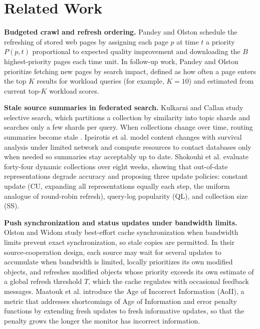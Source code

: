 \section{Related Work}
\label{sec:related}

\textbf{Budgeted crawl and refresh ordering.} Pandey and Olston \cite{pandey2005usercentric} schedule the refreshing of stored web pages by assigning each page $p$ at time $t$ a priority $P(p, t)$ proportional to expected quality improvement and downloading the $B$ highest-priority pages each time unit. In follow-up work, Pandey and Olston \cite{pandey2008crawlorder} prioritize fetching new pages by search impact, defined as how often a page enters the top $K$ results for workload queries (for example, $K = 10$) and estimated from current top-$K$ workload scores.

\textbf{Stale source summaries in federated search.} Kulkarni and Callan \cite{kulkarni2015selective} study selective search, which partitions a collection by similarity into topic shards and searches only a few shards per query. When collections change over time, routing summaries become stale \cite{ipeirotis2005changes,shokouhi2007updating}. Ipeirotis et al. \cite{ipeirotis2005changes} model content changes with survival analysis under limited network and compute resources to contact databases only when needed so summaries stay acceptably up to date. Shokouhi et al. \cite{shokouhi2007updating} evaluate forty-four dynamic collections over eight weeks, showing that out-of-date representations degrade accuracy and proposing three update policies: constant update (CU, expanding all representations equally each step, the uniform analogue of round-robin refresh), query-log popularity (QL), and collection size (SS).

\textbf{Push synchronization and status updates under bandwidth limits.} Olston and Widom \cite{olston2002besteffort} study best-effort cache synchronization when bandwidth limits prevent exact synchronization, so stale copies are permitted. In their source-cooperation design, each source may wait for several updates to accumulate when bandwidth is limited, locally prioritizes its own modified objects, and refreshes modified objects whose priority exceeds its own estimate of a global refresh threshold $T$, which the cache regulates with occasional feedback messages. Maatouk et al. \cite{maatouk2020aoii} introduce the Age of Incorrect Information (AoII), a metric that addresses shortcomings of Age of Information and error penalty functions by extending fresh updates to fresh informative updates, so that the penalty grows the longer the monitor has incorrect information.


